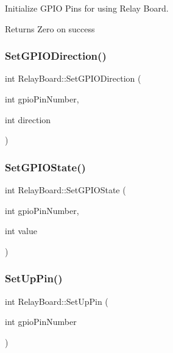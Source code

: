 Initialize G\+P\+IO Pins for using Relay Board.

\begin{DoxyReturn}{Returns}
Zero on success 
\end{DoxyReturn}
\mbox{\label{classRelayBoard_a1011a5d79df5912e20d11053d7811ecd}} 
\subsubsection{\texorpdfstring{Set\+G\+P\+I\+O\+Direction()}{SetGPIODirection()}}
{\footnotesize\ttfamily int Relay\+Board\+::\+Set\+G\+P\+I\+O\+Direction (\begin{DoxyParamCaption}\item[{int}]{gpio\+Pin\+Number,  }\item[{int}]{direction }\end{DoxyParamCaption})}

\mbox{\label{classRelayBoard_a161657ba51adff983bae66543ff5d365}} 
\subsubsection{\texorpdfstring{Set\+G\+P\+I\+O\+State()}{SetGPIOState()}}
{\footnotesize\ttfamily int Relay\+Board\+::\+Set\+G\+P\+I\+O\+State (\begin{DoxyParamCaption}\item[{int}]{gpio\+Pin\+Number,  }\item[{int}]{value }\end{DoxyParamCaption})}

\mbox{\label{classRelayBoard_a11b26e90f7a0831003a002937d28b30b}} 
\subsubsection{\texorpdfstring{Set\+Up\+Pin()}{SetUpPin()}}
{\footnotesize\ttfamily int Relay\+Board\+::\+Set\+Up\+Pin (\begin{DoxyParamCaption}\item[{int}]{gpio\+Pin\+Number }\end{DoxyParamCaption})\hspace{0.3cm}{\ttfamily [private]}}

